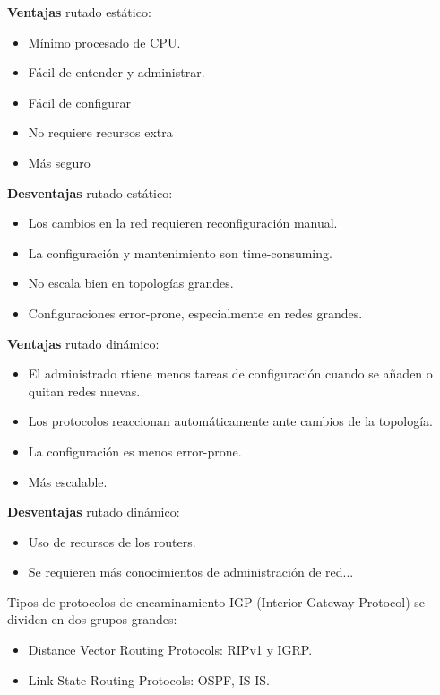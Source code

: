\documentclass[10pt,portrait, twocolumn]{article}
\begin{document}
\textbf{Ventajas} rutado estático:
	\begin{itemize}
		\item Mínimo procesado de CPU.
		\item Fácil de entender y administrar.
		\item Fácil de configurar
		\item No requiere recursos extra
		\item Más seguro 
	\end{itemize}
	
\textbf{Desventajas} rutado estático:

	\begin{itemize}
		\item Los cambios en la red requieren reconfiguración manual.
		\item La configuración y mantenimiento son time-consuming.
		\item No escala bien en topologías grandes.
		\item Configuraciones error-prone, especialmente en redes grandes.
	\end{itemize}

\textbf{Ventajas} rutado dinámico:

	\begin{itemize}
		\item El administrado rtiene menos tareas de configuración cuando se añaden o quitan redes nuevas.
		\item Los protocolos reaccionan automáticamente ante cambios de la topología.
		\item La configuración es menos error-prone.
		\item Más escalable.
	\end{itemize}

\textbf{Desventajas} rutado dinámico:

	\begin{itemize}
		\item Uso de recursos de los routers.
		\item Se requieren más conocimientos de administración de red...
	\end{itemize}
	
Tipos de protocolos de encaminamiento IGP (Interior Gateway Protocol) se dividen en dos grupos grandes:

	\begin{itemize}
		\item Distance Vector Routing Protocols: RIPv1 y IGRP.
		\item Link-State Routing Protocols: OSPF, IS-IS.
	\end{itemize}
\end{document}
